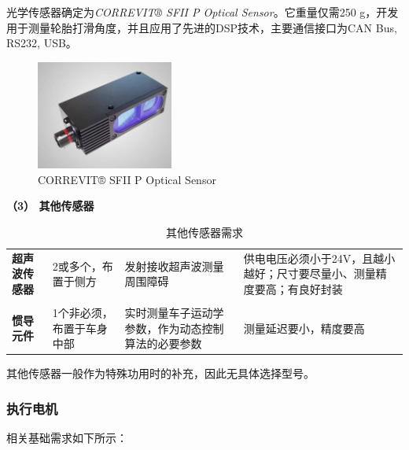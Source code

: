 光学传感器确定为\emph{CORREVIT® SFII P Optical Sensor}。它重量仅需250 g，开发用于测量轮胎打滑角度，并且应用了先进的DSP技术，主要通信接口为CAN Bus, RS232, USB。

\begin{figure}[H]
	\centering
	\includegraphics[width = 0.4\textwidth]{fig/gxcgq.png}
	\caption{CORREVIT® SFII P Optical Sensor}
	\label{gxcgq}
\end{figure}


\textbf{（3） 其他传感器}

\begin{table}[H]
	\centering%
	\caption[centering]{其他传感器需求}%
	\label{qtxq}%
	\begin{tabular}{C{2cm}C{3cm}p{3cm}p{4cm}}	
		\toprule
		 & & &\\ 
		\midrule
		
		\textbf{超声波传感器} & 2或多个，布置于侧方 & 发射接收超声波测量周围障碍 & 供电电压必须小于24V，且越小越好；尺寸要尽量小、测量精度要高；有良好封装 \\
		\\
		\textbf{惯导元件} & 1个非必须，布置于车身中部 & 实时测量车子运动学参数，作为动态控制算法的必要参数 & 测量延迟要小，精度要高 \\		
		
		\bottomrule
	\end{tabular}
\end{table}

其他传感器一般作为特殊功用时的补充，因此无具体选择型号。

\subsubsection{执行电机}

相关基础需求如下所示：

